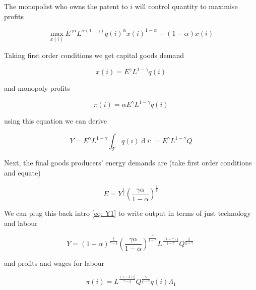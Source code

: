\documentclass[12pt,english]{article}
\DeclareMathOperator{\di}{d}
\theoremstyle{definition}
\theoremstyle{plain}
\theoremstyle{plain}
\theoremstyle{remark}
\theoremstyle{definition}
\theoremstyle{plain}
\theoremstyle{plain}
\theoremstyle{remark}
\theoremstyle{plain}
\theoremstyle{remark}
\theoremstyle{plain}
\theoremstyle{plain}
\theoremstyle{plain}
\begin{document}
The monopolist who owns the patent to $i$ will control quantity to maximise profits 

\begin{equation*}
\max_{x\left(i\right)} E^{\gamma\alpha}L^{\alpha\left(1-\gamma\right)}q\left(i\right)^{\alpha}x\left(i\right)^{1-\alpha} - \left(1-\alpha\right)x\left(i\right)
\end{equation*}




Taking first order conditions we  get capital goods demand 

\begin{equation*}
x\left(i\right) = E^{\gamma}L^{1-\gamma}q\left(i\right)
\end{equation*}

and monopoly profits  

\begin{equation}
\pi\left(i\right)=\alpha E^{\gamma}L^{1-\gamma}q\left(i\right)
\end{equation}

using this equation we can derive 

\begin{equation}\label{eq: Y1}
Y =   E^{\gamma}L^{1-\gamma}\int_{\mathscr{T}}q\left(i\right)\di i \colon = E^{\gamma}L^{1-\gamma}Q
\end{equation}

Next, the final goods producers' energy demands are (take first order conditions and equate)

\begin{equation*}
E = Y^{\frac{1}{\xi}}\left(\frac{\gamma\alpha}{1-\alpha}\right)^{\frac{1}{\xi}}
\end{equation*}

We can plug this back intro \eqref{eq: Y1} to write output in terms of just technology and labour 

\begin{equation}\label{eq: Y2}
	Y = \left(1-\alpha\right)^{\frac{\xi}{\gamma-\xi}}\left(\frac{\gamma \alpha}{1-\alpha}\right)^{\frac{\gamma}{\xi-\gamma}}L^{\frac{\left(1-\gamma\right)\xi}{\xi-\gamma}}Q^{\frac{\xi}{\xi-\gamma}}\	
\end{equation}


and profits and wages for labour 

\begin{equation}
	\pi\left(i\right) = L^{\frac{(\gamma -1) \xi }{\gamma -\xi }} Q^{\frac{\gamma }{\xi -\gamma }}q\left(i\right) \Lambda_{1}
\end{equation}\
\end{document}
